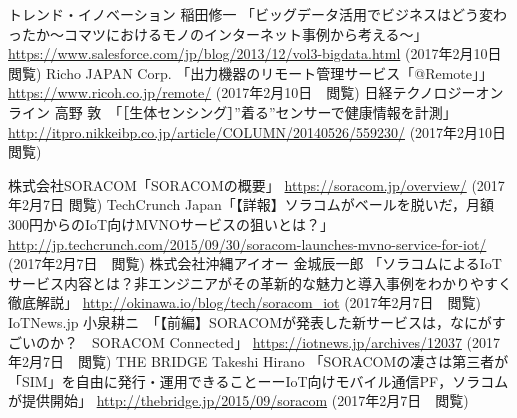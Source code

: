 
\begin{thebibliography}{99}


\begin{comment}
\bibitem{エコパ} eCoPA \url{http://ecopa.in/}
\bibitem{情報通信白書} 平成27年版 情報通信白書(総務省) 「IoTの実現に向けたアプローチと我が国ICT産業の方向性」より \url{http://www.soumu.go.jp/johotsusintokei/whitepaper/ja/h27/html/nc254150.html}
\bibitem{IoT流行語} 6割が「IoTは流行語」--エスキュービズム調査 (ZDBet Japan) \url{http://japan.zdnet.com/article/35093272/}
\bibitem{ガートナー調査} 先進テクノロジのハイプ・サイクル２０１１年　Gartner　\url{https://www.gartner.co.jp/press/html/pr20110907-01.html}
\end{comment}


 トレンド・イノベーション 稲田修一 「ビッグデータ活用でビジネスはどう変わったか〜コマツにおけるモノのインターネット事例から考える〜」 \url{https://www.salesforce.com/jp/blog/2013/12/vol3-bigdata.html} (2017年2月10日　閲覧)
 Richo JAPAN Corp. 「出力機器のリモート管理サービス「@Remote」」\url{https://www.ricoh.co.jp/remote/} (2017年2月10日　閲覧)
 日経テクノロジーオンライン 高野 敦　「［生体センシング］”着る”センサーで健康情報を計測」\url{http://itpro.nikkeibp.co.jp/article/COLUMN/20140526/559230/} (2017年2月10日　閲覧)

 株式会社SORACOM「SORACOMの概要」 \url{https://soracom.jp/overview/} (2017年2月7日 閲覧)
 TechCrunch Japan「【詳報】ソラコムがベールを脱いだ，月額300円からのIoT向けMVNOサービスの狙いとは？」 \url{http://jp.techcrunch.com/2015/09/30/soracom-launches-mvno-service-for-iot/} (2017年2月7日　閲覧)
 株式会社沖縄アイオー 金城辰一郎 「ソラコムによるIoTサービス内容とは？非エンジニアがその革新的な魅力と導入事例をわかりやすく徹底解説」 \url{http://okinawa.io/blog/tech/soracom_iot} (2017年2月7日　閲覧)
 IoTNews.jp 小泉耕ニ　「【前編】SORACOMが発表した新サービスは，なにがすごいのか？　SORACOM Connected」 \url{https://iotnews.jp/archives/12037} (2017年2月7日　閲覧)
 THE BRIDGE Takeshi Hirano 「SORACOMの凄さは第三者が「SIM」を自由に発行・運用できることーーIoT向けモバイル通信PF，ソラコムが提供開始」 \url{http://thebridge.jp/2015/09/soracom} (2017年2月7日　閲覧)
\end{thebibliography}
